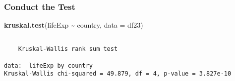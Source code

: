 \documentclass[
]{article}
\newenvironment{Shaded}{\begin{snugshade}}{\end{snugshade}}
\newcommand{\AttributeTok}[1]{\textcolor[rgb]{0.13,0.29,0.53}{#1}}
\newcommand{\FunctionTok}[1]{\textcolor[rgb]{0.13,0.29,0.53}{\textbf{#1}}}
\newcommand{\NormalTok}[1]{#1}
\newcommand{\SpecialCharTok}[1]{\textcolor[rgb]{0.81,0.36,0.00}{\textbf{#1}}}
\begin{document}
\hypertarget{conduct-the-test}{%
\subsubsection{Conduct the Test}\label{conduct-the-test}}

\begin{Shaded}
\begin{Highlighting}[]
\FunctionTok{kruskal.test}\NormalTok{(lifeExp }\SpecialCharTok{\textasciitilde{}}\NormalTok{ country, }\AttributeTok{data =}\NormalTok{ df23)}
\end{Highlighting}
\end{Shaded}

\begin{verbatim}

    Kruskal-Wallis rank sum test

data:  lifeExp by country
Kruskal-Wallis chi-squared = 49.879, df = 4, p-value = 3.827e-10
\end{verbatim}
\end{document}
